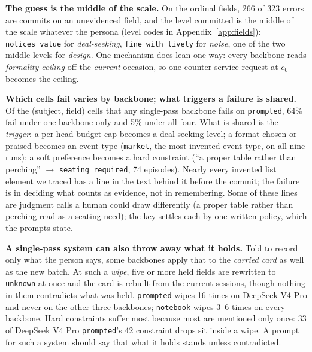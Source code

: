 \documentclass{article}
\begin{document}
\textbf{The guess is the middle of the scale.} On the ordinal fields, 266 of 323 errors
are commits on an unevidenced field, and the level committed is the middle of the scale
whatever the persona (level codes in Appendix~\ref{app:fields}): \texttt{notices\_value} for
\emph{deal-seeking}, \texttt{fine\_with\_lively} for \emph{noise}, one of the two middle levels for
\emph{design}. One mechanism does lean one way: every backbone reads \emph{formality ceiling} off
the \emph{current} occasion, so one counter-service request at $c_0$ becomes the ceiling.

\textbf{Which cells fail varies by backbone; what triggers a failure is shared.} Of the (subject,
field) cells that any single-pass backbone fails on \texttt{prompted}, 64\% fail under one backbone
only and 5\% under all four. What is shared is the \emph{trigger}: a per-head budget cap becomes a
deal-seeking level; a format chosen or praised becomes an event type (\texttt{market}, the
most-invented event type, on all nine runs); a soft preference becomes a hard constraint (``a proper
table rather than perching'' $\to$ \texttt{seating\_required}, 74 episodes). Nearly every invented
list element we traced has a line in the text behind it before the commit; the failure is in
deciding what counts as evidence, not in remembering. Some of these lines are judgment calls a human
could draw differently (a proper table rather than perching read as a seating need); the key settles
each by one written policy, which the prompts state.

\textbf{A single-pass system can also throw away what it holds.} Told to record only what the person
says, some backbones apply that to the \emph{carried card} as well as the new batch. At such a
\emph{wipe}, five or more held fields are rewritten to \texttt{unknown} at once and the card is
rebuilt from the current sessions, though nothing in them contradicts what was held.
\texttt{prompted} wipes 16 times on DeepSeek V4 Pro and never on the other three backbones;
\texttt{notebook} wipes 3--6 times on every backbone. Hard constraints suffer most because most are mentioned only
once: 33 of DeepSeek V4 Pro \texttt{prompted}'s 42 constraint drops sit inside a wipe. A prompt
for such a system should say that what it holds stands unless contradicted.
\end{document}

